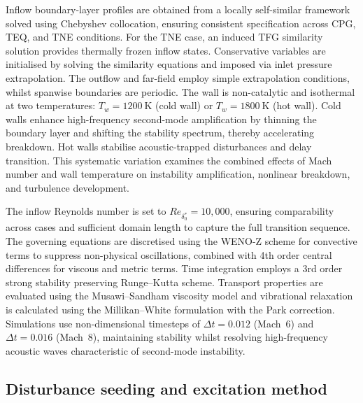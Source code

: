 Inflow boundary-layer profiles are obtained from a locally self-similar framework solved using Chebyshev collocation, ensuring consistent specification across \gls{CPG}, \gls{TEQ}, and \gls{TNE} conditions. For the \gls{TNE} case, an induced \gls{TFG} similarity solution provides thermally frozen inflow states. Conservative variables are initialised by solving the similarity equations and imposed via inlet pressure extrapolation. The outflow and far-field employ simple extrapolation conditions, whilst spanwise boundaries are periodic. The wall is non-catalytic and isothermal at two temperatures: $T_w=1200~\text{K}$ (cold wall) or $T_w=1800~\text{K}$ (hot wall). Cold walls enhance high-frequency second-mode amplification by thinning the boundary layer and shifting the stability spectrum, thereby accelerating breakdown. Hot walls stabilise acoustic-trapped disturbances and delay transition. This systematic variation examines the combined effects of Mach number and wall temperature on instability amplification, nonlinear breakdown, and turbulence development.

The inflow Reynolds number is set to $Re_{\delta^*_0}=10{,}000$, ensuring comparability across cases and sufficient domain length to capture the full transition sequence. The governing equations are discretised using the WENO-Z scheme for convective terms to suppress non-physical oscillations, combined with 4th order central differences for viscous and metric terms. Time integration employs a 3rd order strong stability preserving Runge--Kutta scheme. Transport properties are evaluated using the Musawi--Sandham viscosity model and vibrational relaxation is calculated using the Millikan--White formulation with the Park correction. Simulations use non-dimensional timesteps of $\Delta t = 0.012$ (Mach~6) and $\Delta t = 0.016$ (Mach~8), maintaining stability whilst resolving high-frequency acoustic waves characteristic of second-mode instability.

\subsection{Disturbance seeding and excitation method}

